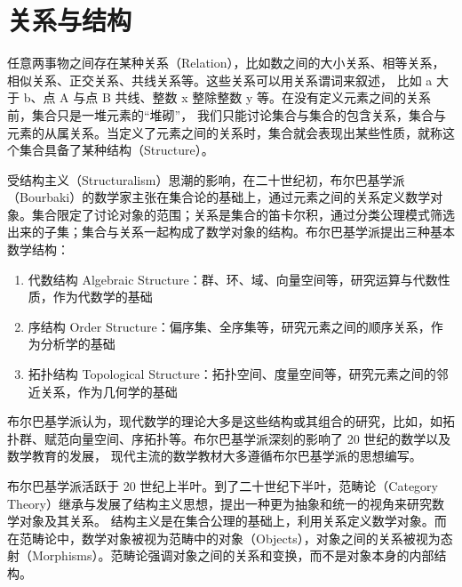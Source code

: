 \chapter{关系与结构}

任意两事物之间存在某种关系（Relation），比如数之间的大小关系、相等关系，相似关系、正交关系、共线关系等。这些关系可以用关系谓词来叙述，
比如 a 大于 b、点 A 与点 B 共线、整数 x 整除整数 y 等。在没有定义元素之间的关系前，集合只是一堆元素的“堆砌”，
我们只能讨论集合与集合的包含关系，集合与元素的从属关系。当定义了元素之间的关系时，集合就会表现出某些性质，就称这个集合具备了某种结构（Structure）。
\vspace{1em}

受结构主义（Structuralism）思潮的影响，在二十世纪初，布尔巴基学派（Bourbaki）的数学家主张在集合论的基础上，通过元素之间的关系定义数学对象。集合限定了讨论对象的范围；关系是集合的笛卡尔积，通过分类公理模式筛选出来的子集；集合与关系一起构成了数学对象的结构。布尔巴基学派提出三种基本数学结构：
\begin{enumerate}
    \item 代数结构 Algebraic Structure：群、环、域、向量空间等，研究运算与代数性质，作为代数学的基础
    \item 序结构 Order Structure：偏序集、全序集等，研究元素之间的顺序关系，作为分析学的基础
    \item 拓扑结构 Topological Structure：拓扑空间、度量空间等，研究元素之间的邻近关系，作为几何学的基础
\end{enumerate}

布尔巴基学派认为，现代数学的理论大多是这些结构或其组合的研究，比如，如拓扑群、赋范向量空间、序拓扑等。布尔巴基学派深刻的影响了 20 世纪的数学以及数学教育的发展，
现代主流的数学教材大多遵循布尔巴基学派的思想编写。
\vspace{1em}

布尔巴基学派活跃于 20 世纪上半叶。到了二十世纪下半叶，范畴论（Category Theory）继承与发展了结构主义思想，提出一种更为抽象和统一的视角来研究数学对象及其关系。
结构主义是在集合公理的基础上，利用关系定义数学对象。而在范畴论中，数学对象被视为范畴中的对象（Objects），对象之间的关系被视为态射（Morphisms）。范畴论强调对象之间的关系和变换，而不是对象本身的内部结构。

\newpage